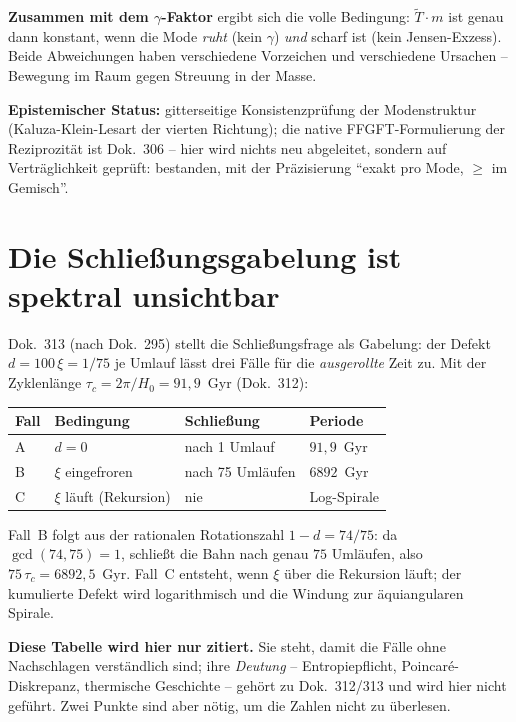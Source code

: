 \textbf{Zusammen mit dem $\gamma$-Faktor} ergibt sich die volle
Bedingung: $\tilde T\cdot m$ ist genau dann konstant, wenn die
Mode \emph{ruht} (kein $\gamma$) \emph{und} scharf ist (kein
Jensen-Exzess). Beide Abweichungen haben verschiedene Vorzeichen
und verschiedene Ursachen -- Bewegung im Raum gegen Streuung in
der Masse.

\textbf{Epistemischer Status:} gitterseitige Konsistenzprüfung der
Modenstruktur (Kaluza-Klein-Lesart der vierten Richtung); die
native FFGFT-Formulierung der Reziprozität ist Dok.~306 -- hier
wird nichts neu abgeleitet, sondern auf Verträglichkeit geprüft:
bestanden, mit der Präzisierung \enquote{exakt pro Mode, $\ge$ im
Gemisch}.

\section{Die Schließungsgabelung ist spektral unsichtbar}

Dok.~313 (nach Dok.~295) stellt die Schließungsfrage als Gabelung:
der Defekt $d = 100\,\xi = 1/75$ je Umlauf lässt drei Fälle für die
\emph{ausgerollte} Zeit zu. Mit der Zyklenlänge
$\tau_c = 2\pi/H_0 = 91{,}9$~Gyr (Dok.~312):

\begin{center}
\begin{tabular}{llll}
\toprule
Fall & Bedingung & Schließung & Periode \\
\midrule
A & $d = 0$ & nach 1 Umlauf & $91{,}9$~Gyr \\
B & $\xi$ eingefroren & nach 75 Umläufen & $6892$~Gyr \\
C & $\xi$ läuft (Rekursion) & nie & Log-Spirale \\
\bottomrule
\end{tabular}
\end{center}

\noindent Fall~B folgt aus der rationalen Rotationszahl
$1-d = 74/75$: da $\gcd(74,75) = 1$, schließt die Bahn nach genau
$75$ Umläufen, also $75\,\tau_c = 6892{,}5$~Gyr. Fall~C entsteht,
wenn $\xi$ über die Rekursion läuft; der kumulierte Defekt wird
logarithmisch und die Windung zur äquiangularen Spirale.

\textbf{Diese Tabelle wird hier nur zitiert.} Sie steht, damit die
Fälle ohne Nachschlagen verständlich sind; ihre \emph{Deutung} --
Entropiepflicht, Poincaré-Diskrepanz, thermische Geschichte --
gehört zu Dok.~312/313 und wird hier nicht geführt. Zwei Punkte
sind aber nötig, um die Zahlen nicht zu überlesen.


